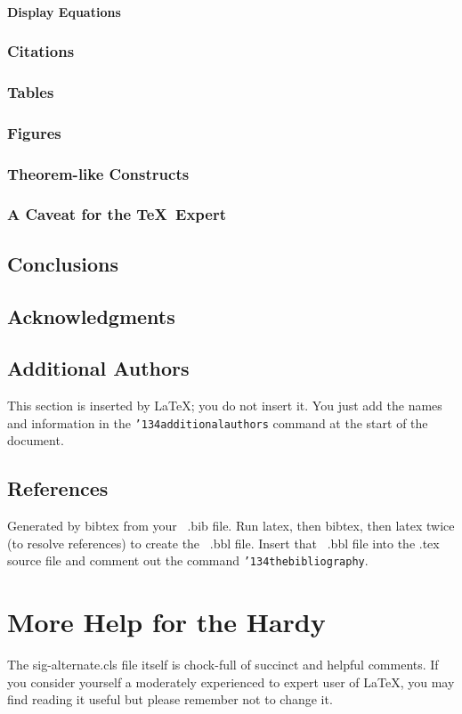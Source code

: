 \documentclass{sig-alternate-05-2015}
\begin{document}
\paragraph{Display Equations}
\subsubsection{Citations}
\subsubsection{Tables}
\subsubsection{Figures}
\subsubsection{Theorem-like Constructs}
\subsubsection{A Caveat for the \TeX\ Expert}
\subsection{Conclusions}
\subsection{Acknowledgments}
\subsection{Additional Authors}
This section is inserted by \LaTeX; you do not insert it.
You just add the names and information in the
\texttt{{\char'134}additionalauthors} command at the start
of the document.
\subsection{References}
Generated by bibtex from your ~.bib file.  Run latex,
then bibtex, then latex twice (to resolve references)
to create the ~.bbl file.  Insert that ~.bbl file into
the .tex source file and comment out
the command \texttt{{\char'134}thebibliography}.
\section{More Help for the Hardy}
The sig-alternate.cls file itself is chock-full of succinct
and helpful comments.  If you consider yourself a moderately
experienced to expert user of \LaTeX, you may find reading
it useful but please remember not to change it.



\end{document}

